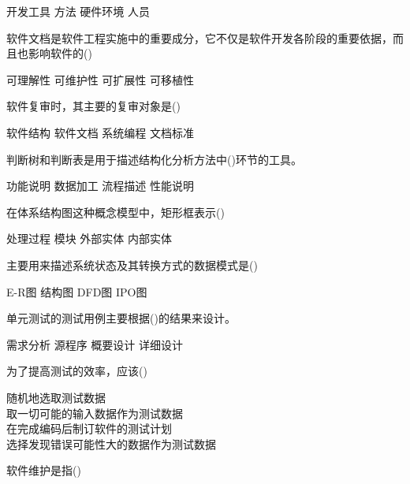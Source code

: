 \documentclass{exam}
\begin{document}
\begin{questions}
	\begin{oneparchoices}
		\choice 开发工具
		\choice 方法
		\choice 硬件环境
		\correctchoice 人员
	\end{oneparchoices}
	\question 软件文档是软件工程实施中的重要成分，它不仅是软件开发各阶段的重要依据，而且也影响软件的()\\
	\begin{oneparchoices}
		\choice 可理解性
		\correctchoice 可维护性
		\choice 可扩展性
		\choice 可移植性
	\end{oneparchoices}
	\question 软件复审时，其主要的复审对象是()\\
	\begin{oneparchoices}
		\choice 软件结构
		\correctchoice 软件文档
		\choice 系统编程
		\choice 文档标准
	\end{oneparchoices}
	\question 判断树和判断表是用于描述结构化分析方法中()环节的工具。\\
	\begin{oneparchoices}
		\choice 功能说明
		\correctchoice 数据加工
		\choice 流程描述
		\choice 性能说明
	\end{oneparchoices}
	\question 在体系结构图这种概念模型中，矩形框表示()\\
	\begin{oneparchoices}
		\choice 处理过程
		\correctchoice 模块
		\choice 外部实体
		\choice 内部实体
	\end{oneparchoices}
	\question 主要用来描述系统状态及其转换方式的数据模式是()\\
	\begin{oneparchoices}
		\choice E-R图
		\choice 结构图
		\choice DFD图
		\correctchoice IPO图
	\end{oneparchoices}
	\question 单元测试的测试用例主要根据()的结果来设计。\\
	\begin{oneparchoices}
		\choice 需求分析
		\choice 源程序
		\choice 概要设计
		\correctchoice 详细设计
	\end{oneparchoices}
	\question 为了提高测试的效率，应该()\\
	\begin{oneparchoices}
		\choice 随机地选取测试数据\\
		\choice 取一切可能的输入数据作为测试数据\\
		\choice 在完成编码后制订软件的测试计划\\
		\correctchoice 选择发现错误可能性大的数据作为测试数据
	\end{oneparchoices}
	\question 软件维护是指()\\

\end{questions}
\end{document}
